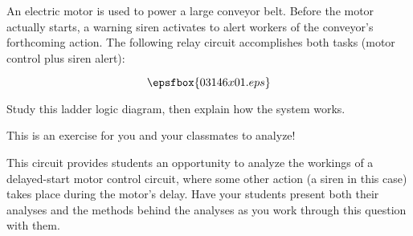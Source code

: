 

An electric motor is used to power a large conveyor belt.  Before the motor actually starts, a warning siren activates to alert workers of the conveyor's forthcoming action.  The following relay circuit accomplishes both tasks (motor control plus siren alert):

$$\epsfbox{03146x01.eps}$$

Study this ladder logic diagram, then explain how the system works.







This is an exercise for you and your classmates to analyze!







This circuit provides students an opportunity to analyze the workings of a delayed-start motor control circuit, where some other action (a siren in this case) takes place during the motor's delay.  Have your students present both their analyses and the methods behind the analyses as you work through this question with them.





